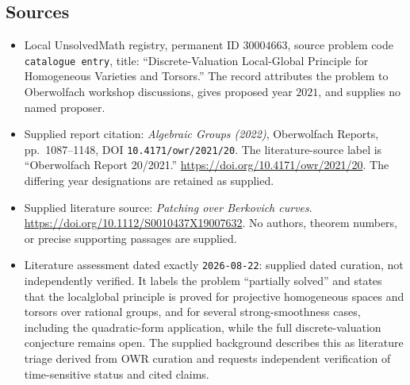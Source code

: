 \documentclass[11pt]{article}
\begin{document}
\subsection{Sources}
\begin{itemize}
\item Local UnsolvedMath registry, permanent ID \(30004663\), source problem code \texttt{catalogue entry}, title: ``Discrete-Valuation Local-Global Principle for Homogeneous Varieties and Torsors.'' The record attributes the problem to Oberwolfach workshop discussions, gives proposed year \(2021\), and supplies no named proposer.
\item Supplied report citation: \emph{Algebraic Groups (2022)}, Oberwolfach Reports, pp.\ 1087--1148, DOI \texttt{10.4171/owr/2021/20}. The literature-source label is ``Oberwolfach Report 20/2021.'' \url{https://doi.org/10.4171/owr/2021/20}. The differing year designations are retained as supplied.
\item Supplied literature source: \emph{Patching over Berkovich curves}. \url{https://doi.org/10.1112/S0010437X19007632}. No authors, theorem numbers, or precise supporting passages are supplied.
\item Literature assessment dated exactly \texttt{2026-08-22}: supplied dated curation, not independently verified. It labels the problem ``partially solved'' and states that the local\textendash global principle is proved for projective homogeneous spaces and torsors over rational groups, and for several strong-smoothness cases, including the quadratic-form application, while the full discrete-valuation conjecture remains open. The supplied background describes this as literature triage derived from OWR curation and requests independent verification of time-sensitive status and cited claims.
\end{itemize}
\end{document}
